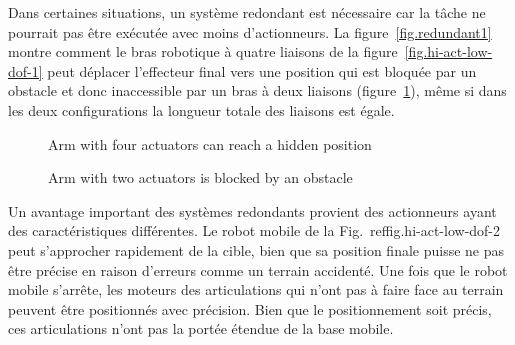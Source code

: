 {Dans certaines situations, un système redondant est nécessaire car la tâche ne pourrait pas être exécutée avec moins d'actionneurs. La figure~\ref{fig.redundant1} montre comment le bras robotique à quatre liaisons de la figure~\ref{fig.hi-act-low-dof-1} peut déplacer l'effecteur final vers une position qui est bloquée par un obstacle et donc inaccessible par un bras à deux liaisons (figure~\ref{fig.redundant2}), même si dans les deux configurations la longueur totale des liaisons est égale.

\begin{figure}
\begin{minipage}{.45\textwidth}
\caption{Arm with four actuators can reach a hidden position}\label{fig.redundant1}
\end{minipage}
\hspace{\fill}
\begin{minipage}{.45\textwidth}
\caption{Arm with two actuators is blocked by an obstacle}\label{fig.redundant2}
\end{minipage}
\end{figure}

Un avantage important des systèmes redondants provient des actionneurs ayant des caractéristiques différentes. Le robot mobile de la Fig.~ref{fig.hi-act-low-dof-2} peut s'approcher rapidement de la cible, bien que sa position finale puisse ne pas être précise en raison d'erreurs comme un terrain accidenté. Une fois que le robot mobile s'arrête, les moteurs des articulations qui n'ont pas à faire face au terrain peuvent être positionnés avec précision. Bien que le positionnement soit précis, ces articulations n'ont pas la portée étendue de la base mobile.

}
